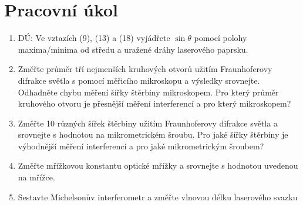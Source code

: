 \section{Pracovní úkol}
\begin{enumerate}
\item DÚ: Ve vztazích (9), (13) a (18) \cite{C_1} vyjádřete $\sin \theta$ pomocí polohy maxima/minima
od středu a uražené dráhy laserového paprsku.
\item  Změřte průměr tří nejmenších kruhových otvorů užitím Fraunhoferovy difrakce světla s
pomocí měřicího mikroskopu a výsledky srovnejte. Odhadněte chybu měření šířky štěrbiny
mikroskopem. Pro který průměr kruhového otvoru je přesnější měření interferencí a pro
který mikroskopem?
\item  Změřte 10 různých šířek štěrbiny užitím Fraunhoferovy difrakce světla a srovnejte s hodnotou
na mikrometrickém šroubu. Pro jaké šířky štěrbiny je výhodnější měření interferencí
a pro jaké mikrometrickým šroubem?
\item Změřte mřížkovou konstantu optické mřížky a srovnejte s hodnotou uvedenou na mřížce.
\item Sestavte Michelsonův interferometr a změřte vlnovou délku laserového svazku
\end{enumerate}

